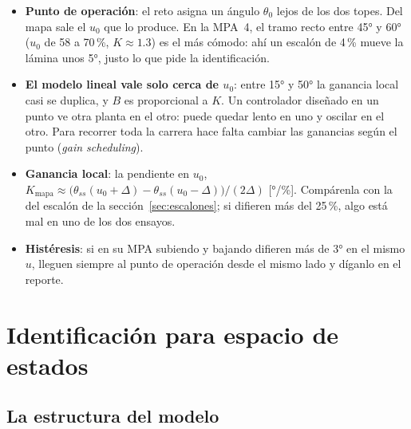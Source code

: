 \documentclass[11pt,letterpaper]{article}
\begin{document}
\begin{itemize}[leftmargin=12pt]
  \item \textbf{Punto de operación}: el reto asigna un ángulo $\theta_0$ lejos de los dos topes. Del mapa sale el $u_0$ que lo produce. En la MPA~4, el tramo recto entre 45° y 60° ($u_0$ de 58 a 70\,\%, $K\approx1.3$) es el más cómodo: ahí un escalón de 4\,\% mueve la lámina unos 5°, justo lo que pide la identificación.
  \item \textbf{El modelo lineal vale solo cerca de $u_0$}: entre 15° y 50° la ganancia local casi se duplica, y $B$ es proporcional a $K$. Un controlador diseñado en un punto ve otra planta en el otro: puede quedar lento en uno y oscilar en el otro. Para recorrer toda la carrera hace falta cambiar las ganancias según el punto (\emph{gain scheduling}).
  \item \textbf{Ganancia local}: la pendiente en $u_0$, $K_\text{mapa}\approx\big(\theta_{ss}(u_0+\Delta)-\theta_{ss}(u_0-\Delta)\big)/(2\Delta)$ [°/\%]. Compárenla con la del escalón de la sección~\ref{sec:escalones}; si difieren más del 25\,\%, algo está mal en uno de los dos ensayos.
  \item \textbf{Histéresis}: si en su MPA subiendo y bajando difieren más de 3° en el mismo $u$, lleguen siempre al punto de operación desde el mismo lado y díganlo en el reporte.
\end{itemize}

\section{Identificación para espacio de estados}\label{sec:ident}

\subsection{La estructura del modelo}
\end{document}

